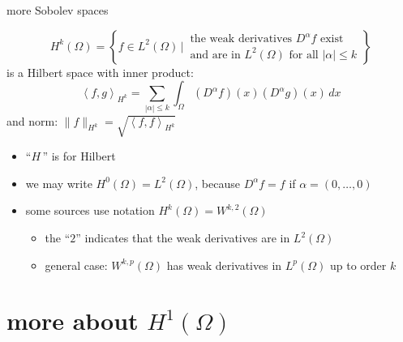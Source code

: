 \documentclass[10pt,
               svgnames,
               hyperref={colorlinks,
                         citecolor=DeepPink4,
                         linkcolor=FireBrick,
                         urlcolor=blue},
               usepdftitle=false]{beamer}
\newcommand{\ip}[2]{\left<#1,#2\right>}
\begin{document}
\begin{frame}{more Sobolev spaces}

\begin{definition}
    $$H^k(\Omega) = \left\{f\in L^2(\Omega) \,\Big|\, \begin{matrix}  \text{the weak derivatives } D^\alpha f \text{ exist} \\ \text{and are in } L^2(\Omega) \text{ for all } |\alpha|\le k\end{matrix} \right\}$$
is a Hilbert space with inner product:
	$$\ip{f}{g}_{H^k} = \sum_{|\alpha|\le k} \int_\Omega (D^\alpha f)(x) (D^\alpha g)(x)\,dx$$
and norm: \quad $\|f\|_{H^k} = \sqrt{\ip{f}{f}_{H^k}}$
\end{definition}

\begin{itemize}
\item ``$H$\,'' is for Hilbert
\item we may write $H^0(\Omega) = L^2(\Omega)$, because $D^\alpha f = f$ if $\alpha=(0,\dots,0)$
\item some sources use notation $H^k(\Omega) = W^{k,2}(\Omega)$
   \begin{itemize}
   \item[$\circ$] the ``$2$'' indicates that the weak derivatives are in $L^2(\Omega)$
   \item[$\circ$] general case: $W^{k,p}(\Omega)$ has weak derivatives in $L^p(\Omega)$ up to order $k$
   \end{itemize}
\end{itemize}
\end{frame}


\section{more about $H^1(\Omega)$}
\end{document}

